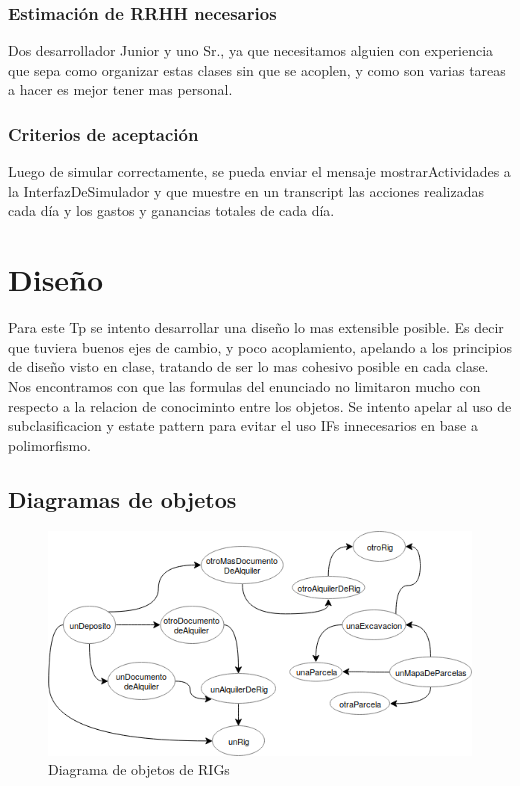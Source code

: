 \documentclass[10pt,a4paper]{article}
\begin{document}
\subsubsection*{Estimación de RRHH necesarios}

Dos desarrollador Junior y uno Sr., ya que necesitamos alguien con experiencia que sepa como organizar estas clases sin que se acoplen, y como son varias tareas a hacer es mejor tener mas personal.

\subsubsection*{Criterios de aceptación}

Luego de simular correctamente, se pueda enviar el mensaje mostrarActividades a la InterfazDeSimulador y que muestre en un transcript las acciones realizadas cada día y los gastos y ganancias totales de cada día.

\pagebreak

\section{Diseño}

Para este Tp se intento desarrollar una diseño lo mas extensible posible. Es decir que tuviera buenos ejes de cambio, y poco acoplamiento, apelando a los principios de diseño visto en clase, tratando de ser lo mas cohesivo posible en cada clase. Nos encontramos con que las formulas del enunciado no limitaron mucho con respecto a la relacion de conociminto entre los objetos. Se intento apelar al uso de subclasificacion y estate pattern para evitar el uso IFs innecesarios en base a polimorfismo.

\subsection{Diagramas de objetos}

\begin{figure}[H]
\centerline{\includegraphics[scale=0.5]{images/DiagramaDeObjetos_deRigs.png}}
\caption{Diagrama de objetos de RIGs}
\end{figure}
\end{document}
